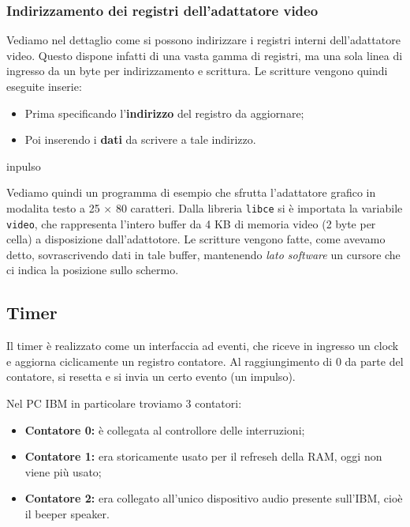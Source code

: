 \documentclass[a4paper,11pt]{article}
\begin{document}
\subsubsection{Indirizzamento dei registri dell'adattatore video}
Vediamo nel dettaglio come si possono indirizzare i registri interni dell'adattatore video.
Questo dispone infatti di una vasta gamma di registri, ma una sola linea di ingresso da un byte per indirizzamento e scrittura.
Le scritture vengono quindi eseguite inserie:
\begin{itemize}
	\item Prima specificando l'\textbf{indirizzo} del registro da aggiornare;
	\item Poi inserendo i \textbf{dati} da scrivere a tale indirizzo.
\end{itemize}inpulso

\par\smallskip

Vediamo quindi un programma di esempio che sfrutta l'adattatore grafico in modalita testo a 25 $\times$ 80 caratteri.
Dalla libreria \lstinline|libce| si è importata la variabile \lstinline|video|, che rappresenta l'intero buffer da 4 KB di memoria video (2 byte per cella) a disposizione dall'adattotore.
Le scritture vengono fatte, come avevamo detto, sovrascrivendo dati in tale buffer, mantenendo \textit{lato software} un cursore che ci indica la posizione sullo schermo.

\lstset{style=codestyle, language=c++}


\subsection{Timer}
Il timer è realizzato come un interfaccia ad eventi, che riceve in ingresso un clock e aggiorna ciclicamente un registro contatore.
Al raggiungimento di 0 da parte del contatore, si resetta e si invia un certo evento (un impulso).

Nel PC IBM in particolare troviamo 3 contatori:
\begin{itemize}
	\item \textbf{Contatore 0:} è collegata al controllore delle interruzioni;
	\item \textbf{Contatore 1:} era storicamente usato per il refreseh della RAM, oggi non viene più usato;
	\item \textbf{Contatore 2:} era collegato all'unico dispositivo audio presente sull'IBM, cioè il beeper speaker.
\end{itemize}
\end{document}
